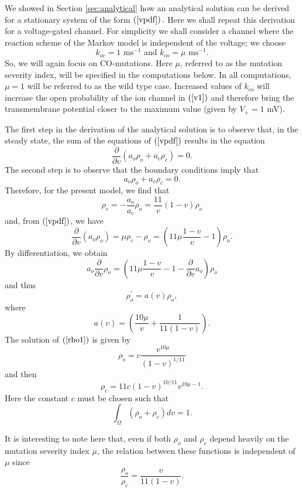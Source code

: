 We showed in Section \ref{sec:analytical} how an analytical solution can be derived
for a stationary system of the form $\left(  \ref{vpdf}\right)  .$ Here we
shall repeat this derivation for a voltage-gated channel. For simplicity we
shall consider a channel where the reaction scheme of the Markov model is
independent of the voltage; we choose%
\[
k_{oc}=1\text{ ms}^{-1}\text{ and }k_{co}=\mu\text{ ms}^{-1}.
\]
So, we will again focus on CO-mutations.
Here $\mu$, referred to as the mutation severity index,
 will be specified in the computations below.  In all computations, $\mu=1$ will be 
 referred to as the wild type case. Increased values of
$k_{co}$ will increase the open probability of the ion channel in $\left(
\ref{v1}\right)  $ and therefore bring the transmembrane potential closer to
the maximum  value (given by $V_{+}=1$ mV). 

The first step in the derivation of the analytical solution is to observe that, in the
steady state, the sum of the equations of $\left(  \ref{vpdf}\right)  $ results
in the equation%
\[
\frac{\partial}{\partial v}\left(  a_{o}\rho_{o}+a_{c}\rho_{c}\right)  =0.
\]
The second step is to observe that the boundary conditions imply that%
\[
a_{o}\rho_{o}+a_{c}\rho_{c}=0.
\]
Therefore, for the present model, we find that%
\[
\rho_{c}=-\frac{a_{o}}{a_{c}}\rho_{o}=\frac{11}{v}\left(  1-v\right)  \rho_{o}%
\]
and, from $\left(  \ref{vpdf}\right)  $, we have
\[
\frac{\partial}{\partial v}\left(  a_{o}\rho_{o}\right)  =\mu\rho_{c}-\rho
_{o}=\left(  11\mu\frac{1-v}{v}-1\right)  \rho_{o}.
\]
By differentiation, we obtain%
\[
a_{o}\frac{\partial}{\partial v}\rho_{o}=\left(  11\mu\frac{1-v}{v}%
-1-\frac{\partial}{\partial v}a_{o}\right)  \rho_{o}%
\]
and thus%
\begin{equation}
\rho_{o}^{\prime}=a(v)\rho_{o}, \label{rho1}%
\end{equation}
where%
\[
a(v)=\left(  \frac{10\mu}{v}+\frac{1}{11(1-v)}\right)  .
\]
The solution of $\left(  \ref{rho1}\right)  $ is given by%
\begin{equation}
\rho_{o}=c\frac{v^{10\mu}}{\left(  1-v\right)  ^{1/11}}\label{rho2}%
\end{equation}
and then%
\[
\rho_{c}=11 c \left(  1-v\right)  ^{10/11}v^{10\mu-1}.
\]
Here the constant $c$ must be chosen such that%
\[
\int_{\Omega}\left(  \rho_{o}+\rho_{c}\right)  dv=1.
\]

It is interesting to note here that, even if both $\rho_o$ and $\rho_c$ depend heavily on the mutation severity 
index $\mu$, the relation between these functions is independent of $\mu$ since
\[ \frac{\rho_o}{\rho_c}=\frac{v}{11(1-v)}. \]

